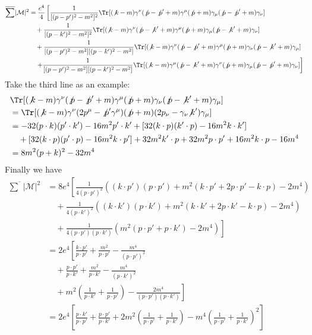 \begin{equation}
\begin{aligned}
\overline{\sum}|\mathcal{M}|^2&=\frac{e^4}{4}\left[
	\frac{1}{[(p-p')^2-m^2]^2}\Tr[({\not k}-m)\gamma^\nu ({\not p}-{\not p}'+m)\gamma^\mu ({\not p}+m)\gamma_{\mu}({\not p}-{\not p}'+m)\gamma_{\nu}]
	\right.
	\\
	&\quad +
	\frac{1}{[(p-k')^2-m^2]^2}\Tr[({\not k}-m)\gamma^\nu ({\not p}-{\not k}'+m)\gamma^\mu ({\not p}+m)\gamma_{\mu}({\not p}-{\not k}'+m)\gamma_{\nu}]\\
	&\quad +
	\frac{1}{[(p-p')^2-m^2][(p-k')^2-m^2]} 
	\Tr[({\not k}-m)\gamma^\nu ({\not p}-{\not p}'+m)\gamma^\mu ({\not p}+m)\gamma_\nu ({\not p}-{\not k}'+m)\gamma_\mu]\\
	&\quad \left.+
	\frac{1}{[(p-p')^2-m^2][(p-k')^2-m^2]}
	\Tr[({\not k}-m)\gamma^\mu({\not p}-{\not k}'+m)\gamma^\nu({\not p}+m)\gamma_\mu ({\not p}-{\not p}'+m)\gamma_\nu]\right]
\end{aligned}
\end{equation}
Take the third line as an example:
\begin{equation}
\begin{aligned}
&\Tr[({\not k}-m)\gamma^\nu ({\not p}-{\not p}'+m)\gamma^\mu ({\not p}+m)\gamma_\nu ({\not p}-{\not k}'+m)\gamma_\mu]
\\
&=\Tr[({\not k}-m)\gamma^\nu (2p^\mu - {\not p}'\gamma^\mu)({\not p}+m)(2p_\nu-\gamma_\nu {\not k}')\gamma_\mu]\\
&=-32(p\cdot k)(p'\cdot k') -16m^2p'\cdot k'+[32(k\cdot p)(k'\cdot p)-16m^2k\cdot k']\\
&\quad +[32(k\cdot p)(p'\cdot p)-16m^2k\cdot p']
+32m^2k'\cdot p+32m^2p\cdot p'+16m^2k\cdot p-16m^4\\
&=8m^2(p+k)^2-32m^4
\end{aligned}
\end{equation}
Finally we have
\begin{equation}
\begin{aligned}
	\overline {\sum}|\mathcal{M}|^2&= 8e^4 \left[
	\frac{1}{4(p\cdot p')^2}((k\cdot p')(p\cdot p')
	+m^2(k\cdot p'+2p\cdot p'-k\cdot p)-2m^4)
	\right.\\
	&\quad +
	\frac{1}{4(p\cdot k')^2}
	((k\cdot k')(p\cdot k')
		+m^2(k\cdot k'+2p\cdot k'-k\cdot p)-2m^4)\\
	&\left.\quad +
	\frac{1}{4(p\cdot p')(p\cdot k')} 
	\left(
	m^2(p\cdot p'+p\cdot k')-2m^4
	\right)
	 \right]\\
	&= 2e^4 \left[
	\frac{k\cdot p'}{p\cdot p'}+\frac{m^2}{p\cdot p'}-\frac{m^4}{(p\cdot p')^2}\right.\\
	&\quad +\frac{p\cdot p'}{p\cdot k'}+\frac{m^2}{p\cdot k'}-\frac{m^4}{(p\cdot k')^2}\\
	&\left.\quad +
	m^2\left(\frac{1}{p\cdot k'}+\frac{1}{p\cdot p'}\right)-\frac{2m^4}{(p\cdot p')(p\cdot k')}
	\right]\\
	&=2e^4\left[\frac{p\cdot k'}{p\cdot p'}+\frac{p\cdot p'}{p\cdot k'}+2m^2\left(\frac{1}{p\cdot p'}+\frac{1}{p\cdot k'}\right)-m^4\left(\frac{1}{p\cdot p'}+\frac{1}{p\cdot k'}\right)^2\right]
\end{aligned}
\end{equation}